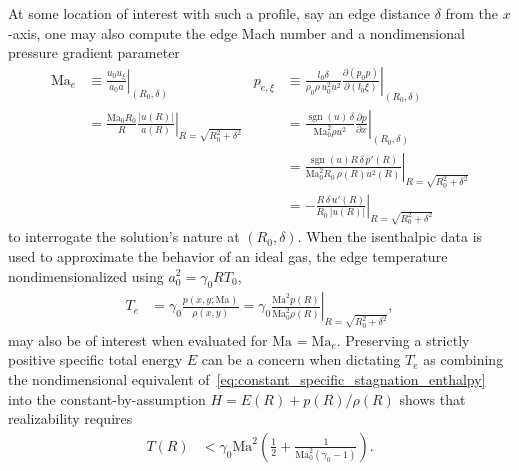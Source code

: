 \documentclass[letterpaper,11pt,nointlimits,reqno]{amsart}
\newcommand{\Mach}[1][]{\mbox{Ma}_{#1}}
\begin{document}
At some location of interest with such a profile, say an edge distance
$\delta$ from the $x$-axis, one may also compute the edge Mach number
and a nondimensional pressure gradient parameter
\begin{align}
  \Mach[e]{}
  &\equiv
  \left. \frac{u_0 u_\xi}{a_0 a} \right|_{\left(R_0,\delta\right)}
&
  p_{e,\xi}
  &\equiv
  \left.
  \frac{l_0 \delta}{\rho_0 \rho \, u_0^2 u^2}
    \frac{\partial\left(p_0 p\right)}{\partial\left(l_0 \xi\right)}
  \right|_{\left(R_0,\delta\right)}
\\&=
  \left.
    \frac{\Mach[0]{} R_0}{R}
    \frac{\left|u\!\left(R\right)\right|}
         {      a\!\left(R\right)       }
  \right|_{R = \sqrt{R_0^2 + \delta^2}}
&
  &=
  \left.
    \frac{\operatorname{sgn}(u) \, \delta}{\Mach[0]^2 \rho u^2}
      \frac{\partial{}p}{\partial{}x}
  \right|_{\left(R_0,\delta\right)}
\\
&&
  &=
  \left.
    \frac{\operatorname{sgn}(u) R \, \delta \, p'\!\left(R\right)}
         {\Mach[0]^2 R_0 \, \rho\!\left(R\right) u^2\!\left(R\right)}
  \right|_{R=\sqrt{R_0^2 + \delta^2}}
\\
&&
  &=
  - \left.
      \frac{R \, \delta \, u'\!\left(R\right)}
           {R_0 \, \left|u\!\left(R\right)\right|}
  \right|_{R=\sqrt{R_0^2 + \delta^2}}
\label{eq:qoidef}
\end{align}
to interrogate the solution's nature at $\left(R_0, \delta\right)$. When the
isenthalpic data is used to approximate the behavior of an ideal gas, the
edge temperature nondimensionalized using $a_0^2=\gamma_{0}RT_0$,
\begin{align}
    T_e &= \gamma_0 \frac{p\!\left(x,y;\Mach\right)}{\rho\!\left(x,y\right)}
         = \left. \gamma_0 \frac{\Mach^2    p   \!\left(R\right)}
                                {\Mach[0]^2 \rho\!\left(R\right)}
           \right|_{R=\sqrt{R_0^2 + \delta^2}}
\label{eq:Tedef}
,
\end{align}
may also be of interest when evaluated for $\Mach = \Mach[e]$.  Preserving a
strictly positive specific total energy $E$ can be a concern when dictating
$T_e$ as combining the nondimensional equivalent
of~\eqref{eq:constant_specific_stagnation_enthalpy} into the
constant-by-assumption $H = E\!\left(R\right) +
p\!\left(R\right)/\rho\!\left(R\right)$ shows that realizability requires
\begin{align}
    T\!\left(R\right) &< \gamma_0 \Mach^2 \left(
      \frac{1}{2} + \frac{1}{\Mach[0]^2\left(\gamma_0 - 1\right)}
         \right)
\label{eq:Terestrict}
.
\end{align}
\end{document}
